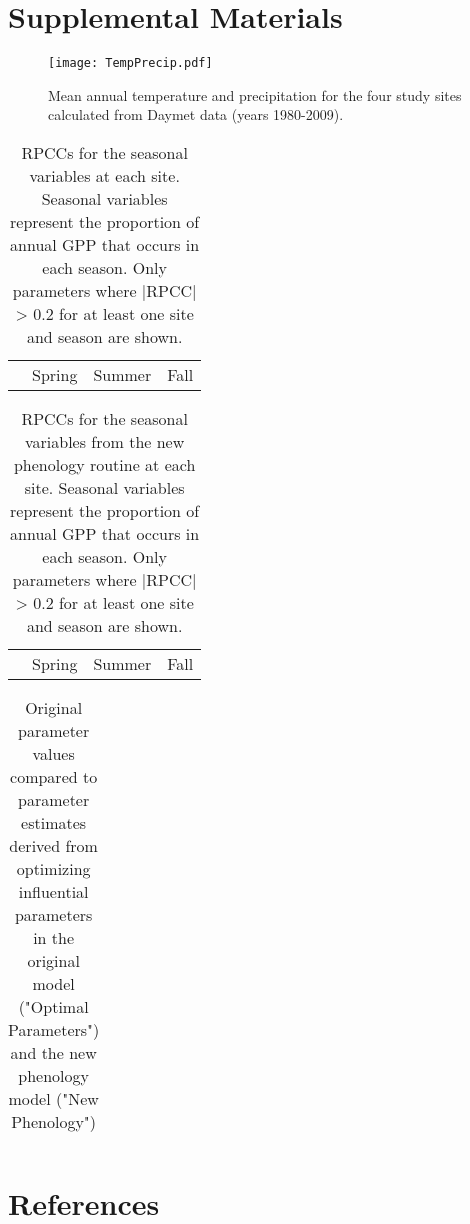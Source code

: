 \documentclass[]{article}
\newcommand{\beginsupplement}{%
	\setcounter{table}{0}
	\renewcommand{\thetable}{S\arabic{table}}%
	\setcounter{figure}{0}
	\renewcommand{\thefigure}{S\arabic{figure}}%
}
\begin{document}
\beginsupplement
\section{Supplemental Materials}
\begin{figure}[!htbp]
	\begin{measuredfigure}
		\texttt{[image: TempPrecip.pdf]}
		\caption{Mean annual temperature and precipitation for the four study sites calculated from Daymet data (years 1980-2009).}
		\label{fig:tempprecip}
	\end{measuredfigure}
\end{figure}

\begin{table}[ht]
	\begin{threeparttable}
		\caption{RPCCs for the seasonal variables at each site. Seasonal variables represent the proportion of annual GPP that occurs in each season. Only parameters where |RPCC| > 0.2 for at least one site and season are shown.} 
		\begin{tabular}{lrrrrrrrrrrrr}
			\toprule
			& \multicolumn{4}{c}{Spring} & \multicolumn{4}{c}{Summer} & \multicolumn{4}{c}{Fall} \\
			\cmidrule(lr){2-5} \cmidrule(lr){6-9} \cmidrule(lr){10-13}
			
		\end{tabular}
	\end{threeparttable}
\end{table}

\begin{table}[ht]
	\begin{threeparttable}
		\caption{RPCCs for the seasonal variables from the new phenology routine at each site. Seasonal variables represent the proportion of annual GPP that occurs in each season. Only parameters where |RPCC| > 0.2 for at least one site and season are shown.} 
		\begin{tabular}{lrrrrrrrrrrrr}
			\toprule
			& \multicolumn{4}{c}{Spring} & \multicolumn{4}{c}{Summer} & \multicolumn{4}{c}{Fall} \\
			\cmidrule(lr){2-5} \cmidrule(lr){6-9} \cmidrule(lr){10-13}
			
		\end{tabular}
	\end{threeparttable}
\end{table}

\begin{table}[ht]
	\begin{threeparttable} %
		\caption{Original parameter values compared to parameter estimates derived from optimizing influential parameters in the original model ("Optimal Parameters") and the new phenology model ("New Phenology")} 
		\begin{tabularx}{.5\textwidth}{p{1.6cm}*{3}{>{\centering\arraybackslash}X}}
			\toprule
			
		\end{tabularx}
	\end{threeparttable}
\end{table}

\section{References}


\end{document}
